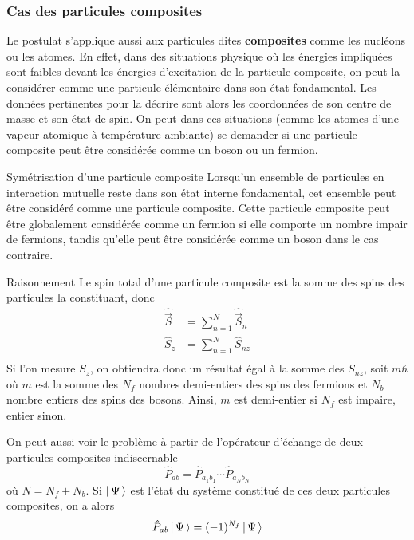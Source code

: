         \subsubsection{Cas des particules composites}

        Le postulat s’applique aussi aux particules dites \textbf{composites} comme les nucléons ou les atomes. En effet, dans des situations physique où les énergies impliquées sont faibles devant les énergies d’excitation de la particule composite, on peut la considérer comme une particule élémentaire dans son état fondamental. Les données pertinentes pour la décrire sont alors les coordonnées de son centre de masse et son état de spin. On peut dans ces situations (comme les atomes d’une vapeur atomique à température ambiante) se demander si une particule composite peut être considérée comme un boson ou un fermion.

        \begin{omed}{Symétrisation d’une particule composite}
            Lorsqu’un ensemble de particules en interaction mutuelle reste dans son état interne fondamental, cet ensemble peut être considéré comme une particule composite. Cette particule composite peut être globalement considérée comme un fermion si elle comporte un nombre impair de fermions, tandis qu’elle peut être considérée comme un boson dans le cas contraire.
        \end{omed}

        \begin{demo}{Raisonnement}
            Le spin total d’une particule composite est la somme des spins des particules la constituant, donc 
        \begin{align*}
            \hat{\vec{S}} &= \sum_{n=1}^N \hat{\vec{S}}_n \\
            \hat{S}_z &= \sum_{n=1}^N \hat{S}_{nz} \\
        \end{align*}
        Si l’on mesure $S_z$, on obtiendra donc un résultat égal à la somme des $S_{nz}$, soit $m\hbar$ où $m$ est la somme des $N_f$ nombres demi-entiers des spins des fermions et $N_b$ nombre entiers des spins des bosons. Ainsi, $m$ est demi-entier si $N_f$ est impaire, entier sinon. 

        On peut aussi voir le problème à partir de l’opérateur d’échange de deux particules composites indiscernable 
        \[ \hat{P}_{ab} = \hat{P}_{a_1 b_1} \cdots \hat{P}_{a_N b_N} \]   
        où $N = N_f + N_b$. Si $\left| \, \Psi \, \right>$ est l’état du système constitué de ces deux particules composites, on a alors 
        \[ \hat{P}_{ab}\left| \, \Psi \, \right> = (-1)^{N_f} \left| \, \Psi \, \right> \] 
        \end{demo}


